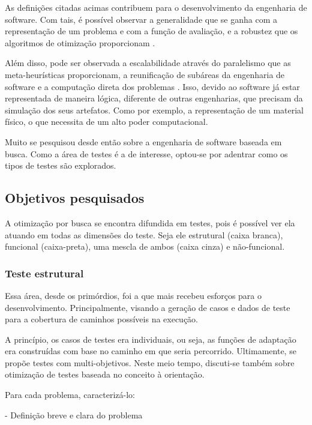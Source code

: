 As definições citadas acimas contribuem para o desenvolvimento da engenharia de software. Com tais, é possível observar a generalidade que se ganha com a representação de um problema e com a função de avaliação, e a robustez que os algoritmos de otimização proporcionam \cite{harman2012search}. 

Além disso, pode ser observada a escalabilidade através do paralelismo que as meta-heurísticas proporcionam, a reunificação de subáreas da engenharia de software e a computação direta dos problemas \cite{harman2012search}. Isso, devido ao software já estar representada de maneira lógica, diferente de outras engenharias, que precisam da simulação dos seus artefatos. Como por exemplo, a representação de um material físico, o que necessita de um alto poder computacional.

Muito se pesquisou desde então sobre a engenharia de software baseada em busca. Como a área de testes é a de interesse, optou-se por adentrar como os tipos de testes são explorados.

\subsection{Objetivos pesquisados}

A otimização por busca se encontra difundida em testes, pois é possível ver ela atuando em todas as dimensões do teste. Seja ele estrutural (caixa branca), funcional (caixa-preta), uma mescla de ambos (caixa cinza) e não-funcional.

\subsubsection{Teste estrutural}

Essa área, desde os primórdios, foi a que mais recebeu esforços para o desenvolvimento. Principalmente, visando a geração de casos e dados de teste para a cobertura de caminhos possíveis na execução. 

A princípio, os casos de testes era individuais, ou seja, as funções de adaptação era construídas com base no caminho em que seria percorrido. Ultimamente, se propõe testes com multi-objetivos. 
Neste meio tempo, discuti-se também sobre otimização de testes baseada no conceito à orientação. 


Para cada problema, caracterizá-lo:

- Definição breve e clara do problema

